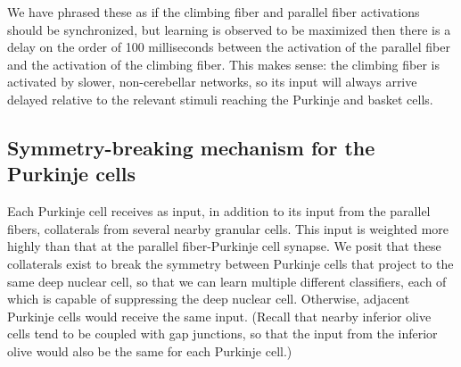 \documentclass{article}
\theoremstyle{definition}
\begin{document}
We have phrased these as if the climbing fiber and parallel fiber
activations should be synchronized, but learning is observed to be
maximized then there is a delay on the order of 100 milliseconds
between the activation of the parallel fiber and the activation of the
climbing fiber. This makes sense: the climbing fiber is activated by
slower, non-cerebellar networks, so its input will always arrive
delayed relative to the relevant stimuli reaching the Purkinje and
basket cells.

\subsection{Symmetry-breaking mechanism for the Purkinje cells}

Each Purkinje cell receives as input, in addition to its input from
the parallel fibers, collaterals from several nearby granular
cells. This input is weighted more highly than that at the parallel
fiber-Purkinje cell synapse. We posit that these collaterals exist to
break the symmetry between Purkinje cells that project to the same
deep nuclear cell, so that we can learn multiple different
classifiers, each of which is capable of suppressing the deep nuclear
cell. Otherwise, adjacent Purkinje cells would receive the same input.
(Recall that nearby inferior olive cells tend to be coupled with gap
junctions, so that the input from the inferior olive would also be the
same for each Purkinje cell.)
\end{document}
